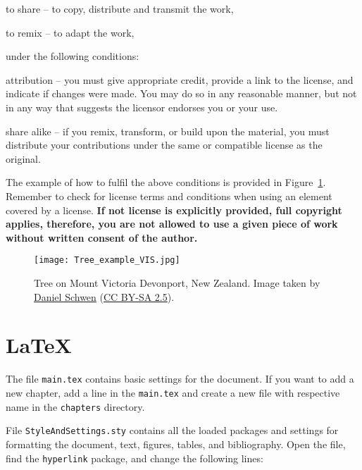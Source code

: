 \begin{tight_itemize}
    \item to share – to copy, distribute and transmit the work,
    \item to remix – to adapt the work,
\end{tight_itemize}

under the following conditions:

\begin{tight_itemize}
    \item attribution – you must give appropriate credit, provide a link to the license, and indicate if changes were made. You may do so in any reasonable manner, but not in any way that suggests the licensor endorses you or your use.
    \item share alike – if you remix, transform, or build upon the material, you must distribute your contributions under the same or compatible license as the original.
\end{tight_itemize}

The example of how to fulfil the above conditions is provided in Figure~\ref{fig:tree}. Remember to check for license terms and conditions when using an element covered by a license. \textbf{If not license is explicitly provided, full copyright applies, therefore, you are not allowed to use a given piece of work without written consent of the author.}

\begin{figure}
 \centering
 \texttt{[image: Tree\_example\_VIS.jpg]}
 \caption{\label{fig:tree}Tree on Mount Victoria Devonport, New Zealand. Image taken by \href{https://commons.wikimedia.org/wiki/User:Dschwen}{Daniel Schwen} (\href{https://creativecommons.org/licenses/by-sa/2.5/deed.en}{CC BY-SA 2.5}).}
\end{figure}

\section{\label{sec:latex}\LaTeX}

The file \texttt{main.tex} contains basic settings for the document. If you want to add a new chapter, add a line in the \texttt{main.tex} and create a new file with respective name in the \texttt{chapters} directory.

File \texttt{StyleAndSettings.sty} contains all the loaded packages and settings for formatting the document, text, figures, tables, and bibliography. Open the file, find the \texttt{hyperlink} package, and change the following lines:

